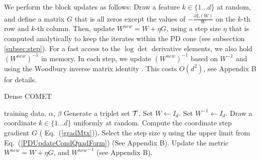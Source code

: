 \documentclass[twoside,11pt]{article}
\newcommand\mat[1]{{#1}}
\newcommand{\T}{{}^\mathsf{T}}
\newcommand{\W}{\mat{W}}
\newcommand{\newW}{{\mat{W^{new}}}}
\newcommand{\tL}{\tilde{L}(\W)}
\newcommand{\cholL}{\mat{L}}
\newcommand{\grd}{\frac{\partial \tL}{\W}}
\renewcommand{\eqref}[1]{Eq.~(\ref{#1})}
\begin{document}
We perform the block updates as follows: %
Draw a feature $k \in \{1 \ldots d$\} at random, and define a matrix $\mat{G}$ that is all zeros except the values of $-\grd$ on the $k$-th row and $k$-th column. Then, update $\newW = \W +\eta \mat{G}$, using a step size $\eta$ that is computed analytically to keep the iterates within the PD cone (see subsection \ref{subsec:step}).
For a fast access to the $\log\det$ derivative elements, we also hold $(\newW)^{-1}$ in memory. In each step, we update $(\newW)^{-1}$ based on $\W^{-1}$ and using the Woodbury inverse matrix identity \citep{woodbury1950inverting}. This costs $O(d^2)$, see Appendix B for details.

\begin{algorithm}[th]
   \caption{Dense COMET}
   \label{alg:comet}
\begin{algorithmic}[1]
    training data, $\alpha$, $\beta$
   Generate a triplet set $\cal{T}$. Set  $\W  \leftarrow I_d$. Set $\W^{-1}  \leftarrow I_d$. %
   \REPEAT 
   \STATE Draw a coordinate $k \in \{1 \ldots d\}$ uniformly at random. 
   \STATE Compute the coordinate step gradient $\mat{G}$ ( \eqref{gradMtx}).
   \STATE Select the step size $\eta$ using the upper limit from \eqref{PDUpdateCondQuadForm} (See Appendix B).
   \STATE Update the metric $\newW=\W+\eta G$, and $\newW^{-1}$ (see Appendix B).
\end{algorithmic}
\vskip -5pt
\end{algorithm}

\vspace{-6pt}
\end{document}
